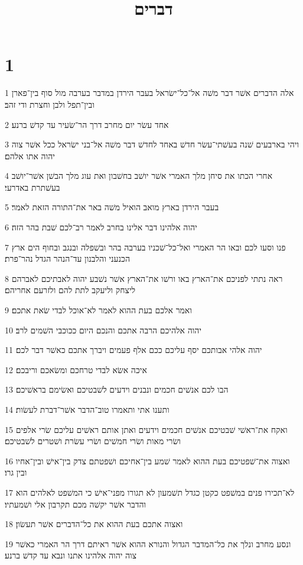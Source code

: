 

\title{דברים}


\chapter{1}

\par 1 אלה הדברים אשׁר דבר משׁה אל־כל־ישׂראל בעבר הירדן במדבר בערבה מול סוף בין־פארן ובין־תפל ולבן וחצרת ודי זהב׃
\par 2 אחד עשׂר יום מחרב דרך הר־שׂעיר עד קדשׁ ברנע׃
\par 3 ויהי בארבעים שׁנה בעשׁתי־עשׂר חדשׁ באחד לחדשׁ דבר משׁה אל־בני ישׂראל ככל אשׁר צוה יהוה אתו אלהם׃
\par 4 אחרי הכתו את סיחן מלך האמרי אשׁר יושׁב בחשׁבון ואת עוג מלך הבשׁן אשׁר־יושׁב בעשׁתרת באדרעי׃
\par 5 בעבר הירדן בארץ מואב הואיל משׁה באר את־התורה הזאת לאמר׃
\par 6 יהוה אלהינו דבר אלינו בחרב לאמר רב־לכם שׁבת בהר הזה׃
\par 7 פנו וסעו לכם ובאו הר האמרי ואל־כל־שׁכניו בערבה בהר ובשׁפלה ובנגב ובחוף הים ארץ הכנעני והלבנון עד־הנהר הגדל נהר־פרת׃
\par 8 ראה נתתי לפניכם את־הארץ באו ורשׁו את־הארץ אשׁר נשׁבע יהוה לאבתיכם לאברהם ליצחק וליעקב לתת להם ולזרעם אחריהם׃
\par 9 ואמר אלכם בעת ההוא לאמר לא־אוכל לבדי שׂאת אתכם׃
\par 10 יהוה אלהיכם הרבה אתכם והנכם היום ככוכבי השׁמים לרב׃
\par 11 יהוה אלהי אבותכם יסף עליכם ככם אלף פעמים ויברך אתכם כאשׁר דבר לכם׃
\par 12 איכה אשׂא לבדי טרחכם ומשׂאכם וריבכם׃
\par 13 הבו לכם אנשׁים חכמים ונבנים וידעים לשׁבטיכם ואשׂימם בראשׁיכם׃
\par 14 ותענו אתי ותאמרו טוב־הדבר אשׁר־דברת לעשׂות׃
\par 15 ואקח את־ראשׁי שׁבטיכם אנשׁים חכמים וידעים ואתן אותם ראשׁים עליכם שׂרי אלפים ושׂרי מאות ושׂרי חמשׁים ושׂרי עשׂרת ושׁטרים לשׁבטיכם׃
\par 16 ואצוה את־שׁפטיכם בעת ההוא לאמר שׁמע בין־אחיכם ושׁפטתם צדק בין־אישׁ ובין־אחיו ובין גרו׃
\par 17 לא־תכירו פנים במשׁפט כקטן כגדל תשׁמעון לא תגורו מפני־אישׁ כי המשׁפט לאלהים הוא והדבר אשׁר יקשׁה מכם תקרבון אלי ושׁמעתיו׃
\par 18 ואצוה אתכם בעת ההוא את כל־הדברים אשׁר תעשׂון׃
\par 19 ונסע מחרב ונלך את כל־המדבר הגדול והנורא ההוא אשׁר ראיתם דרך הר האמרי כאשׁר צוה יהוה אלהינו אתנו ונבא עד קדשׁ ברנע׃
